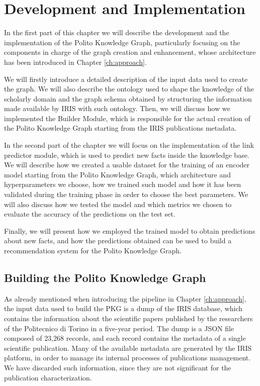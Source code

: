 \documentclass[%
    corpo=13.5pt,
    twoside,
    oldstyle,
    tipotesi=magistrale,
    greek,
    evenboxes
]{toptesi}
\begin{document}
\chapter{Development and Implementation}

In the first part of this chapter we will describe the development and the
implementation of the Polito Knowledge Graph, particularly focusing
on the components in charge of the graph creation and enhancement, whose
architecture has been introduced in Chapter \ref{ch:approach}.

We will firstly introduce a detailed description of the input data used to
create the graph. We will also describe the ontology used to shape the
knowledge of the scholarly domain and the graph schema obtained by structuring
the information made available by IRIS with such ontology.
Then, we will discuss how we implemented the Builder Module, which is
responsible for the actual creation of the Polito Knowledge Graph starting
from the IRIS publications metadata.

In the second part of the chapter we will focus on the implementation of the
link predictor module, which is used to predict new facts inside the knowledge
base.
We will describe how we created a usable dataset for the training of an
encoder model starting from the Polito Knowledge Graph, which
architecture and hyperparameters we choose, how we trained such model and
how it has been validated during the training phase in order to choose the
best parameters.
We will also discuss how we tested the model and which metrics we chosen
to evaluate the accuracy of the predictions on the test set.

Finally, we will present how we employed the trained model to obtain
predictions about new facts, and how the predictions obtained
can be used to build a recommendation system for the Polito Knowledge Graph.


\section{Building the Polito Knowledge Graph}
\label{sec:buildingpkg}

As already mentioned when introducing the pipeline in Chapter \ref{ch:approach},
the input data used to
build the PKG is a dump of the IRIS database, which contains the information about
the scientific papers published by the researchers of the Politecnico di
Torino in a five-year period.
The dump is a JSON file composed of 23,268 records, and each record contains
the metadata of a single scientific publication.
Many of the available metadata are generated by the IRIS platform, in
order to manage its internal processes of publications management.
We have discarded such information, since they are not
significant for the publication characterization.
\end{document}
